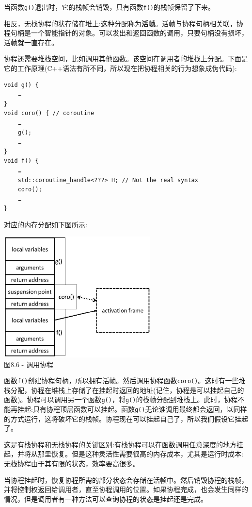 当函数\texttt{g()}退出时，它的栈帧会销毁，只有函数\texttt{f()}的栈帧保留了下来。

相反，无栈协程的状存储在堆上:这种分配称为\textbf{活帧}。活帧与协程句柄相关联，协程句柄是一个智能指针的对象。可以发出和返回函数的调用，只要句柄没有损坏，活帧就一直存在。

协程还需要堆栈空间，比如调用其他函数。该空间在调用者的堆栈上分配。下面是它的工作原理(C++语法有所不同，所以现在把协程相关的行为想象成伪代码):

\begin{lstlisting}[style=styleCXX]
void g() {
	…
}
void coro() { // coroutine
	…
	g();
	…
}
void f() {
	…
	std::coroutine_handle<???> H; // Not the real syntax
	coro();
	…
}
\end{lstlisting}

对应的内存分配如下图所示:

\begin{center}
\includegraphics[width=0.6\textwidth]{content/2/chapter8/images/6.jpg}\\
图8.6 - 调用协程
\end{center}

函数\texttt{f()}创建协程句柄，所以拥有活帧。然后调用协程函数\texttt{coro()}。这时有一些堆栈分配，协程在堆栈上存储了在挂起时返回的地址(记住，协程是可以挂起自己的函数)。协程可以调用另一个函数\texttt{g()}，将\texttt{g()}的栈帧分配到堆栈上。此时，协程不能再挂起:只有协程顶层函数可以挂起。函数\texttt{g()}无论谁调用最终都会返回，以同样的方式运行，这将破坏它的栈帧。协程现在可以挂起自己了，所以我们假设它挂起了。 

这是有栈协程和无栈协程的关键区别:有栈协程可以在函数调用任意深度的地方挂起，并将从那里恢复。但是这种灵活性需要很高的内存成本，尤其是运行时成本:无栈协程由于其有限的状态，效率要高很多。

当协程挂起时，恢复协程所需的部分状态会存储在活帧中。然后销毁协程的栈帧，并将控制权返回给调用者，直至协程调用的位置。如果协程完成，也会发生同样的情况，但是调用者有一种方法可以查询协程的状态是挂起还是完成。

